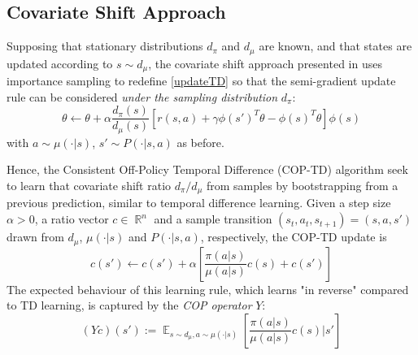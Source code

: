 \documentclass[12pt,a4paper,openright,twoside]{article}
\DeclareMathOperator*{\E}{\mathbb{E}}
\DeclareMathOperator*{\R}{\mathbb{R}}
\numberwithin{equation}{section}
\theoremstyle{definition}
\theoremstyle{remark}
\theoremstyle{plain}
\begin{document}
\subsection{Covariate Shift Approach} \label{COPTD}

Supposing that stationary distributions $d_\pi$ and $d_\mu$ are known, and that states are updated according to $s\sim d_\mu$, the covariate shift approach presented in \cite{COPTD} uses importance sampling to redefine \ref{updateTD} so that the semi-gradient update rule can be considered \textit{under the sampling distribution} $d_\pi$:
\begin{equation} \label{updateTDimportance}
    \theta \leftarrow \theta + \alpha \frac{d_\pi(s)}{d_\mu (s)}\left[ r(s,a) + \gamma\phi(s')^T \theta - \phi(s)^T \theta \right] \phi(s)
\end{equation}
with $a\sim \mu(\cdot|s)$, $s' \sim P(\cdot|s,a)$ as before. 

Hence, the Consistent Off-Policy Temporal Difference\cite{COPTD} (COP-TD) algorithm seek to learn that covariate shift ratio $d_\pi / d_\mu$ from samples by bootstrapping from a previous prediction, similar to temporal difference learning. Given a step size $\alpha > 0$, a ratio vector $c \in \R^n$ and a sample transition $(s_t,a_t,s_{t+1}) = (s,a,s')$ drawn from $d_\mu$, $\mu(\cdot|s)$ and $P(\cdot|s,a)$, respectively, the COP-TD update is
\begin{equation} \label{COP}
    c(s') \leftarrow c(s') + \alpha \left[\frac{\pi(a|s)}{\mu(a|s)}c(s) + c(s') \right]
\end{equation}
The expected behaviour of this learning rule, which learns "in reverse" compared to TD learning, is captured by the \textit{COP operator} $Y$:
\begin{equation} \label{COPoperator}
    (Yc)(s') := \E_{s \sim d_\mu, a \sim \mu(\cdot|s)} \left[ \frac{\pi(a|s)}{\mu(a|s)}c(s)  \bigg| s' \right]
\end{equation}
\end{document}
